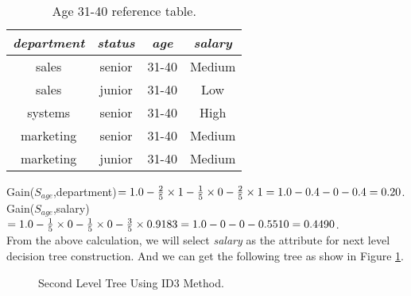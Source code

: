 \documentclass{article}
\begin{document}
\begin{enumerate}
\begin{enumerate}
\begin{table}[H]
  \begin{center}
    \begin{tabular}{|c|c|c|c|}
      \hline {\it department} & {\it status}&{\it age}&{\it salary} \\
      \hline 
      sales & senior & 31-40 & Medium \\
      sales & junior & 31-40 & Low \\
      systems & senior & 31-40 & High \\
      marketing & senior & 31-40 & Medium \\
      marketing & junior & 31-40 & Medium \\
      \hline
    \end{tabular}
    \caption{Age 31-40 reference table.\label{tbl:medium}}
  \end{center}
  \vspace{-10pt}
\end{table}

Gain($S_{age}$,department)$ = 1.0 - \frac{2}{5}\times 1 -
\frac{1}{5}\times 0 - \frac{2}{5}\times 1 \\
= 1.0 - 0.4 - 0 - 0.4\\
= 0.20$. \\

Gain($S_{age}$,salary)$ 
= 1.0-\frac{1}{5}\times 0-\frac{1}{5}\times 0 -\frac{3}{5}\times 0.9183\\
= 1.0 - 0 - 0 - 0.5510\\
= 0.4490$. \\

From the above calculation, we will select {\it salary} as the
attribute for next level decision tree construction. And we can get
the following tree as show in Figure \ref{fig:id3-2}.\\

\begin{figure}[H]
  \vspace{-10pt}
  \begin{center}
    \caption{Second Level Tree Using ID3 Method.\label{fig:id3-2}}
    \vspace{-10pt}
  \end{center}
\end{figure}


\end{enumerate}
\end{enumerate}
\end{document}
